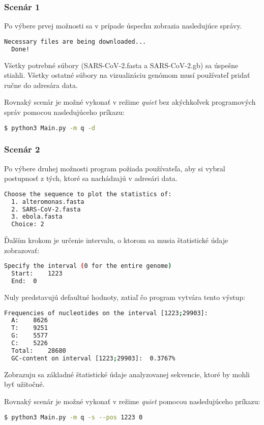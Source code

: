 \subsubsection{Scenár 1}
Po výbere prvej možnosti sa v prípade úspechu zobrazia nasledujúce správy.
\begin{lstlisting}[language=bash]
  Necessary files are being downloaded...
  Done!
\end{lstlisting}
Všetky potrebné súbory (SARS-CoV-2.fasta a SARS-CoV-2.gb) sa úspešne stiahli.
Všetky ostatné súbory na vizualizáciu genómom musí používateľ pridať ručne do adresára {\selectfont data}.

\bigskip
Rovnaký scenár je možné vykonať v režime \textit{quiet} bez akýchkoľvek programových správ pomocou nasledujúceho príkazu:
\begin{lstlisting}[language=bash]
  $ python3 Main.py -m q -d
\end{lstlisting}


\subsubsection{Scenár 2}
Po výbere druhej možnosti program požiada používateľa, aby si vybral postupnosť z tých, ktoré sa nachádzajú v adresári {\selectfont data}.
\begin{lstlisting}[language=bash]
  Choose the sequence to plot the statistics of:
  1. alteromonas.fasta
  2. SARS-CoV-2.fasta
  3. ebola.fasta
  Choice: 2
\end{lstlisting}
Ďalším krokom je určenie intervalu, o ktorom sa musia štatistické údaje zobrazovať:
\begin{lstlisting}[language=bash]
  Specify the interval (0 for the entire genome)
  Start:	1223
  End:	0
\end{lstlisting}

Nuly predstavujú defaultné hodnoty, zatiaľ čo program vytvára tento výstup:
\begin{lstlisting}[language=bash]
  Frequencies of nucleotides on the interval [1223;29903]:
  A:	8626
  T:	9251
  G:	5577
  C:	5226
  Total:	28680
  GC-content on interval [1223;29903]:	0.3767%
\end{lstlisting}
Zobrazuju sa základné štatistické údaje analyzovanej sekvencie, ktoré by mohli byť užitočné.


\bigskip
Rovnaký scenár je možné vykonať v režime \textit{quiet} pomocou nasledujúceho príkazu:
\begin{lstlisting}[language=bash]
  $ python3 Main.py -m q -s --pos 1223 0
\end{lstlisting}



